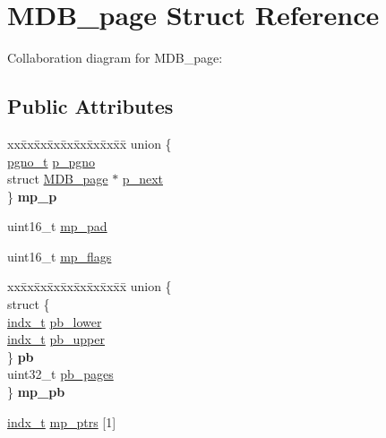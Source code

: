\hypertarget{struct_m_d_b__page}{}\section{M\+D\+B\+\_\+page Struct Reference}
\label{struct_m_d_b__page}


Collaboration diagram for M\+D\+B\+\_\+page\+:
\subsection*{Public Attributes}
\begin{DoxyCompactItemize}
\item 
\mbox{\label{struct_m_d_b__page_aac25e0f00e9260cd4e74433264aa0f97}} 
\begin{tabbing}
xx\=xx\=xx\=xx\=xx\=xx\=xx\=xx\=xx\=\kill
union \{\\
\>\mbox{\hyperlink{group__internal_gadb65f0424c9d3827bf6409087ad555cd}{pgno\_t}} \mbox{\hyperlink{struct_m_d_b__page_a6843bdabaf55bcabe210d81df5cd80fb}{p\_pgno}}\\
\>struct \mbox{\hyperlink{struct_m_d_b__page}{MDB\_page}} $\ast$ \mbox{\hyperlink{struct_m_d_b__page_a8e6bf1e38b724bd6087da61bd3d35858}{p\_next}}\\
\} {\bfseries mp\_p}\\

\end{tabbing}\item 
uint16\+\_\+t \mbox{\hyperlink{struct_m_d_b__page_a02eb008ff64ead97bfacccf6f154f7fe}{mp\+\_\+pad}}
\item 
uint16\+\_\+t \mbox{\hyperlink{struct_m_d_b__page_a851621a8c9f179faf4bdb82eb3b65e1e}{mp\+\_\+flags}}
\item 
\mbox{\label{struct_m_d_b__page_ab5a44567ab8f0629acf1b44840f6e7fb}} 
\begin{tabbing}
xx\=xx\=xx\=xx\=xx\=xx\=xx\=xx\=xx\=\kill
union \{\\
\>struct \{\\
\>\>\mbox{\hyperlink{group__internal_ga730e17f748208d77496ebd895c8375dc}{indx\_t}} \mbox{\hyperlink{struct_m_d_b__page_aae5a99c09df21f2cc03bea30ded4cf77}{pb\_lower}}\\
\>\>\mbox{\hyperlink{group__internal_ga730e17f748208d77496ebd895c8375dc}{indx\_t}} \mbox{\hyperlink{struct_m_d_b__page_a1fd74cc370377addbb519ae429718b33}{pb\_upper}}\\
\>\} {\bfseries pb}\\
\>uint32\_t \mbox{\hyperlink{struct_m_d_b__page_a85165930b6c7036e9b570fc86a5f4ace}{pb\_pages}}\\
\} {\bfseries mp\_pb}\\

\end{tabbing}\item 
\mbox{\hyperlink{group__internal_ga730e17f748208d77496ebd895c8375dc}{indx\+\_\+t}} \mbox{\hyperlink{struct_m_d_b__page_ae0e2d177c6a934322ef3736875d70caf}{mp\+\_\+ptrs}} \mbox{[}1\mbox{]}
\end{DoxyCompactItemize}



